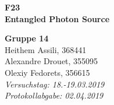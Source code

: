 


	
\begin{titlepage}
	\thispagestyle{empty}
		
	\hspace{0pt}
	\vspace{2cm}
	\begin{center}
		\hdashrule{\linewidth}{1pt}{}
		\vskip -0.5cm
		\hdashrule{\linewidth}{0.5pt}{}
		
		\vspace{0.5cm}
		\Huge{ \textbf{ F23 \\}}
		\LARGE{ \textbf{Entangled Photon Source} } 
		
		\hdashrule{\linewidth}{0.5pt}{}
		\vskip -0.95cm
		\hdashrule{\linewidth}{1pt}{}
		
		\vspace{3cm}
		\Large{\textbf{ Gruppe 14 \\}}
		\Large{Heithem Assili, 368441 \\ Alexandre Drouet, 355095 \\ Olexiy Fedorets, 356615 \\}
		\vspace{1cm}
		\Large{\textsl{ Versuchstag: 18.-19.03.2019 \\ Protokollabgabe: 02.04.2019}}
		
	\end{center}
	\vfill
	
\end{titlepage}
	
	
	
{}
\thispagestyle{plain}

\tableofcontents
\newpage
\listoffigures

\listoftables

\skippage

\setcounter{page}{1}
\restoregeometry
\thispagestyle{fancy}

\section{}


